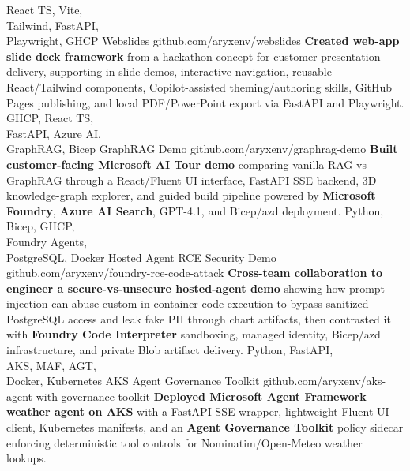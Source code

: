 \documentclass[8pt]{developercv} %
\begin{document}
\vspace{-8 pt}
\begin{entrylist}
    \entry
            {React TS, Vite, \\Tailwind, FastAPI, \\Playwright, GHCP}
            {Webslides}
            {github.com/aryxenv/webslides}
            {\textbf{Created web-app slide deck framework} from a hackathon concept for customer presentation delivery, supporting in-slide demos, interactive navigation, reusable React/Tailwind components, Copilot-assisted theming/authoring skills, GitHub Pages publishing, and local PDF/PowerPoint export via FastAPI and Playwright.}
    \entry
            {GHCP, React TS, \\FastAPI, Azure AI, \\GraphRAG, Bicep}
    {GraphRAG Demo}
    {github.com/aryxenv/graphrag-demo}
    {\textbf{Built customer-facing Microsoft AI Tour demo} comparing vanilla RAG vs GraphRAG through a React/Fluent UI interface, FastAPI SSE backend, 3D knowledge-graph explorer, and guided build pipeline powered by \textbf{Microsoft Foundry}, \textbf{Azure AI Search}, GPT-4.1, and Bicep/azd deployment.}
    \entry
            {Python, \\Bicep, GHCP, \\Foundry Agents, \\PostgreSQL, Docker}
    {Hosted Agent RCE Security Demo}
    {github.com/aryxenv/foundry-rce-code-attack}
    {\textbf{Cross-team collaboration to engineer a secure-vs-unsecure hosted-agent demo} showing how prompt injection can abuse custom in-container code execution to bypass sanitized PostgreSQL access and leak fake PII through chart artifacts, then contrasted it with \textbf{Foundry Code Interpreter} sandboxing, managed identity, Bicep/azd infrastructure, and private Blob artifact delivery.}
    \entry
            {Python, FastAPI, \\AKS, MAF, AGT, \\Docker, Kubernetes}
    {AKS Agent Governance Toolkit}
    {github.com/aryxenv/aks-agent-with-governance-toolkit}
    {\textbf{Deployed Microsoft Agent Framework weather agent on AKS} with a FastAPI SSE wrapper, lightweight Fluent UI client, Kubernetes manifests, and an \textbf{Agent Governance Toolkit} policy sidecar enforcing deterministic tool controls for Nominatim/Open-Meteo weather lookups.}
\end{entrylist}
\end{document}
